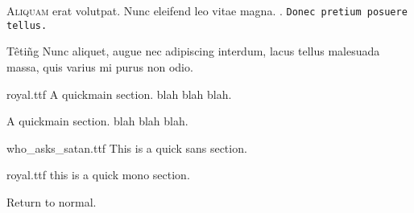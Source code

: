 \documentclass[class=article, crop=false]{standalone}
\title{\titlelink{\basictitle}{}}
\author{John Grey}
\date{21-09-2025}
\def\basictitle{\quickfontfam Basic}
\begin{document}
\IfStandalone{\maketitle}{\chapterlink*{\basictitle}{}}


\lettrine[lines=3]{A}{liquam} erat volutpat.  Nunc eleifend leo vitae magna. . \tt{Donec pretium posuere tellus.}
\cite{abnett07__broth_snake_} 



\huge{Têtiñg} \normalsize
Nunc aliquet, augue nec adipiscing interdum, lacus tellus malesuada massa, quis varius mi purus non odio.

\begin{quickmain}{royal.ttf}
A quickmain section. blah blah blah.
\end{quickmain}

\begin{quickmain}{}
A quickmain section. blah blah blah.
\end{quickmain}

\begin{quickmain}{who_asks_satan.ttf}
  This is a quick sans section.
\end{quickmain}
  
\begin{quickmain}{royal.ttf}
  this is a quick mono section.
\end{quickmain}

\noindent Return to normal.





\IfStandalone{
  \nocite{*}
  
  
  }{}
\end{document}
